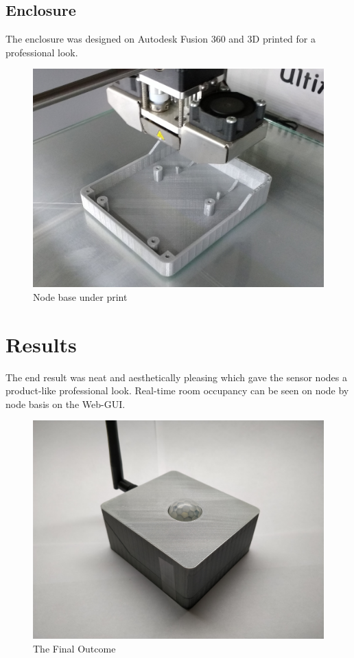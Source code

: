 \documentclass[journal]{IEEEtran}
\begin{document}
\subsection{Enclosure}
The enclosure was designed on Autodesk Fusion 360 and 3D printed for a professional look.

\begin{figure}[ht]
	\centering
	\includegraphics[scale=0.06]{3DPrint.jpg}
	\caption{Node base under print}
	\label{fig_print}
\end{figure}

\section{Results}
The end result was neat and aesthetically pleasing which gave the sensor nodes a product-like professional look. Real-time room occupancy can be seen on node by node basis on the Web-GUI.

\begin{figure}[ht]
	\centering
	\includegraphics[scale=0.04]{FinalProduct.jpg}
	\caption{The Final Outcome}
	\label{fig_print}
\end{figure}
\end{document}
